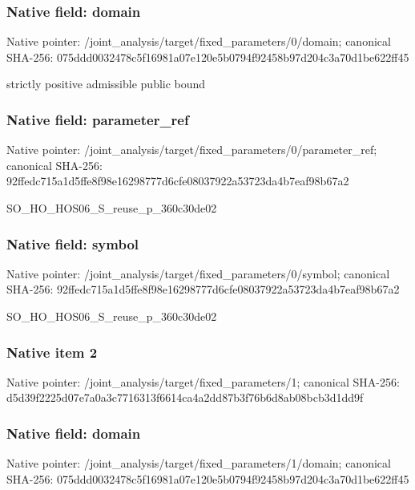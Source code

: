 \documentclass[10pt,a4paper]{article}
\begin{document}
\subsubsection{Native field: domain}
Native pointer: /joint\_\allowbreak{}analysis/target/fixed\_\allowbreak{}parameters/0/domain; canonical SHA-256: 075ddd0032478c5f16981a07e120e5b0794f92458b97d204c3a70d1be622ff45

\begingroup\raggedright\sloppy strictly positive admissible public bound\par\endgroup

\subsubsection{Native field: parameter\_\allowbreak{}ref}
Native pointer: /joint\_\allowbreak{}analysis/target/fixed\_\allowbreak{}parameters/0/parameter\_\allowbreak{}ref; canonical SHA-256: 92ffedc715a1d5ffe8f98e16298777d6cfe08037922a53723da4b7eaf98b67a2

\begingroup\raggedright\sloppy SO\_\allowbreak{}HO\_\allowbreak{}HOS06\_\allowbreak{}S\_\allowbreak{}reuse\_\allowbreak{}p\_\allowbreak{}360c30de02\par\endgroup

\subsubsection{Native field: symbol}
Native pointer: /joint\_\allowbreak{}analysis/target/fixed\_\allowbreak{}parameters/0/symbol; canonical SHA-256: 92ffedc715a1d5ffe8f98e16298777d6cfe08037922a53723da4b7eaf98b67a2

\begingroup\raggedright\sloppy SO\_\allowbreak{}HO\_\allowbreak{}HOS06\_\allowbreak{}S\_\allowbreak{}reuse\_\allowbreak{}p\_\allowbreak{}360c30de02\par\endgroup

\subsubsection{Native item 2}
Native pointer: /joint\_\allowbreak{}analysis/target/fixed\_\allowbreak{}parameters/1; canonical SHA-256: d5d39f2225d07e7a0a3c7716313f6614ca4a2dd87b3f76b6d8ab08bcb3d1dd9f

\subsubsection{Native field: domain}
Native pointer: /joint\_\allowbreak{}analysis/target/fixed\_\allowbreak{}parameters/1/domain; canonical SHA-256: 075ddd0032478c5f16981a07e120e5b0794f92458b97d204c3a70d1be622ff45
\end{document}
